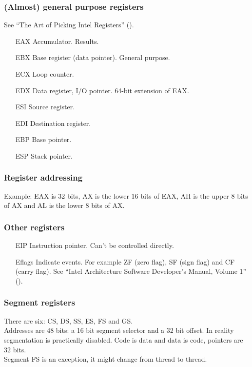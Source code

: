 \documentclass[slidestop,compress,mathserif, xcolor=table]{beamer}
\begin{document}
\begin{frame}
  \frametitle{(Almost) general purpose registers}

  See ``The Art of Picking Intel Registers'' (\cite{swanson2003}).

  \begin{enumerate}
  \item[EAX] Accumulator. Results.
  \item[EBX] Base register (data pointer). General purpose.
  \item[ECX] Loop counter.
  \item[EDX] Data register, I/O pointer. 64-bit extension of EAX.
  \item[ESI] Source register.
  \item[EDI] Destination register.
  \item[EBP] Base pointer.
  \item[ESP] Stack pointer.
  \end{enumerate}
\end{frame}

\begin{frame}
  \frametitle{Register addressing}

  Example: EAX is 32 bits, AX is the lower 16 bits of EAX, AH is the upper 8
  bits of AX and AL is the lower 8 bits of AX.
\end{frame}

\begin{frame}
  \frametitle{Other registers}

  \begin{enumerate}
  \item[EIP] Instruction pointer. Can't be controlled directly.
  \item[Eflags] Indicate events. For example ZF (zero flag), SF (sign
    flag) and CF (carry flag). See ``Intel Architecture Software Developer's
    Manual, Volume 1'' (\cite{intel1999-vol1}).
  \end{enumerate}
\end{frame}

\begin{frame}
  \frametitle{Segment registers}

  There are six: CS, DS, SS, ES, FS and GS.\\[1em]

  Addresses are 48 bits: a 16 bit segment selector and a 32 bit offset. In
  reality segmentation is practically disabled. Code is data and data is code,
  pointers are 32 bits.\\[1em]

  Segment FS is an exception, it might change from thread to thread.
\end{frame}
\end{document}
